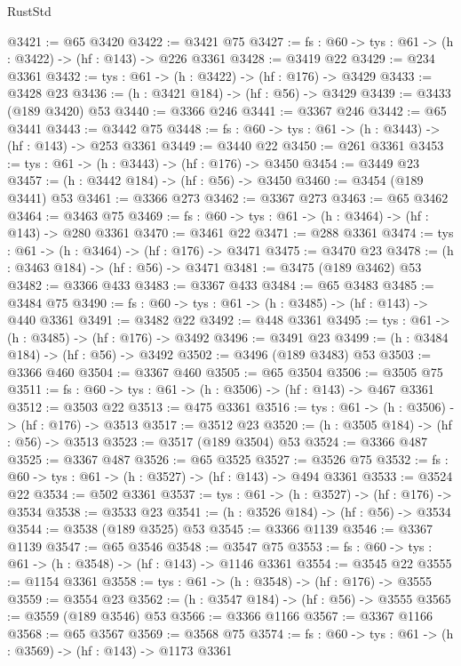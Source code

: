 \begin{lexlean}{RustStd}
\begin{coremodule}
@3421 := @65 @3420
@3422 := @3421 @75
@3427 := {fs : @60} -> {tys : @61} -> (h : @3422) -> (hf : @143) -> @226 @3361
@3428 := @3419 @22
@3429 := @234 @3361
@3432 := {tys : @61} -> (h : @3422) -> (hf : @176) -> @3429
@3433 := @3428 @23
@3436 := (h : @3421 @184) -> (hf : @56) -> @3429
@3439 := @3433 (@189 @3420) @53
@3440 := @3366 @246
@3441 := @3367 @246
@3442 := @65 @3441
@3443 := @3442 @75
@3448 := {fs : @60} -> {tys : @61} -> (h : @3443) -> (hf : @143) -> @253 @3361
@3449 := @3440 @22
@3450 := @261 @3361
@3453 := {tys : @61} -> (h : @3443) -> (hf : @176) -> @3450
@3454 := @3449 @23
@3457 := (h : @3442 @184) -> (hf : @56) -> @3450
@3460 := @3454 (@189 @3441) @53
@3461 := @3366 @273
@3462 := @3367 @273
@3463 := @65 @3462
@3464 := @3463 @75
@3469 := {fs : @60} -> {tys : @61} -> (h : @3464) -> (hf : @143) -> @280 @3361
@3470 := @3461 @22
@3471 := @288 @3361
@3474 := {tys : @61} -> (h : @3464) -> (hf : @176) -> @3471
@3475 := @3470 @23
@3478 := (h : @3463 @184) -> (hf : @56) -> @3471
@3481 := @3475 (@189 @3462) @53
@3482 := @3366 @433
@3483 := @3367 @433
@3484 := @65 @3483
@3485 := @3484 @75
@3490 := {fs : @60} -> {tys : @61} -> (h : @3485) -> (hf : @143) -> @440 @3361
@3491 := @3482 @22
@3492 := @448 @3361
@3495 := {tys : @61} -> (h : @3485) -> (hf : @176) -> @3492
@3496 := @3491 @23
@3499 := (h : @3484 @184) -> (hf : @56) -> @3492
@3502 := @3496 (@189 @3483) @53
@3503 := @3366 @460
@3504 := @3367 @460
@3505 := @65 @3504
@3506 := @3505 @75
@3511 := {fs : @60} -> {tys : @61} -> (h : @3506) -> (hf : @143) -> @467 @3361
@3512 := @3503 @22
@3513 := @475 @3361
@3516 := {tys : @61} -> (h : @3506) -> (hf : @176) -> @3513
@3517 := @3512 @23
@3520 := (h : @3505 @184) -> (hf : @56) -> @3513
@3523 := @3517 (@189 @3504) @53
@3524 := @3366 @487
@3525 := @3367 @487
@3526 := @65 @3525
@3527 := @3526 @75
@3532 := {fs : @60} -> {tys : @61} -> (h : @3527) -> (hf : @143) -> @494 @3361
@3533 := @3524 @22
@3534 := @502 @3361
@3537 := {tys : @61} -> (h : @3527) -> (hf : @176) -> @3534
@3538 := @3533 @23
@3541 := (h : @3526 @184) -> (hf : @56) -> @3534
@3544 := @3538 (@189 @3525) @53
@3545 := @3366 @1139
@3546 := @3367 @1139
@3547 := @65 @3546
@3548 := @3547 @75
@3553 := {fs : @60} -> {tys : @61} -> (h : @3548) -> (hf : @143) -> @1146 @3361
@3554 := @3545 @22
@3555 := @1154 @3361
@3558 := {tys : @61} -> (h : @3548) -> (hf : @176) -> @3555
@3559 := @3554 @23
@3562 := (h : @3547 @184) -> (hf : @56) -> @3555
@3565 := @3559 (@189 @3546) @53
@3566 := @3366 @1166
@3567 := @3367 @1166
@3568 := @65 @3567
@3569 := @3568 @75
@3574 := {fs : @60} -> {tys : @61} -> (h : @3569) -> (hf : @143) -> @1173 @3361

\end{coremodule}
\end{lexlean}
